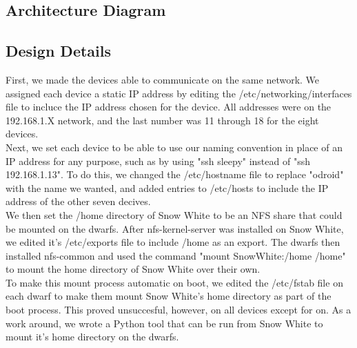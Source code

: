 \subsection{ Architecture  Diagram}



\subsection{Design Details}
First, we made the devices able to communicate on the same network. We assigned each device a static IP address by editing the /etc/networking/interfaces file to incluce the IP address chosen for the device. All addresses were on the 192.168.1.X network, and the last number was 11 through 18 for the eight devices. \\

Next, we set each device to be able to use our naming convention in place of an IP address for any purpose, such as by using "ssh sleepy" instead of "ssh 192.168.1.13". To do this, we changed the /etc/hostname file to replace "odroid" with the name we wanted, and added entries to /etc/hosts to include the IP address of the other seven decives. \\

We then set the /home directory of Snow White to be an NFS share that could be mounted on the dwarfs. After nfs-kernel-server was installed on Snow White, we edited it's /etc/exports file to include /home as an export. The dwarfs then installed nfs-common and used the command "mount SnowWhite:/home /home" to mount the home directory of Snow White over their own. \\

To make this mount process automatic on boot, we edited the /etc/fstab file on each dwarf to make them mount Snow White's home directory as part of the boot process. This proved unsuccesful, however, on all devices except for on. As a work around, we wrote a Python tool that can be run from Snow White to mount it's home directory on the dwarfs.

